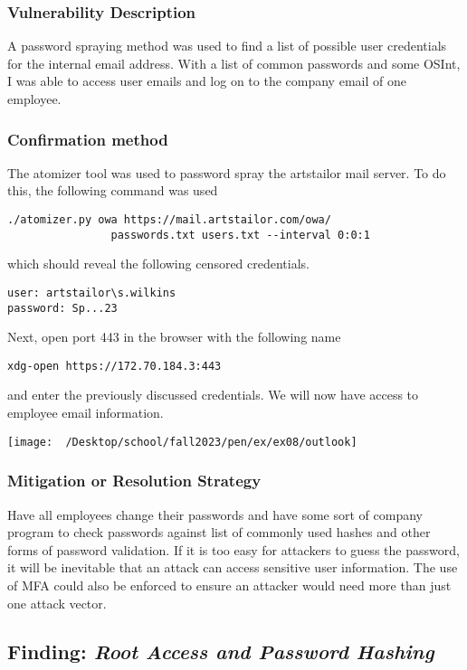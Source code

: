 \documentclass[notitlepage]{article}
\begin{document}
  	\subsubsection*{Vulnerability Description}
  		A password spraying method was used to find a list of possible user credentials for the internal email address. With a list of
        common passwords and some OSInt, I was able to access user emails and log on to the company email of one employee.

  	\subsubsection*{Confirmation method}
    The atomizer tool was used to password spray the artstailor mail server. To do this, the following
    command was used
\begin{verbatim}
./atomizer.py owa https://mail.artstailor.com/owa/ 
                passwords.txt users.txt --interval 0:0:1
\end{verbatim}
        which should reveal the following censored credentials.
\begin{verbatim}
user: artstailor\s.wilkins
password: Sp...23
\end{verbatim}
    Next, open port 443 in the browser with the following name
\begin{verbatim}
xdg-open https://172.70.184.3:443
\end{verbatim}
    and enter the previously discussed credentials. We will now have access to employee email information.
    
\texttt{[image: ~/Desktop/school/fall2023/pen/ex/ex08/outlook]}
				
    \subsubsection*{Mitigation or Resolution Strategy}
        Have all employees change their passwords and have some sort of company program to check passwords against list of commonly used hashes and other forms of password validation.
        If it is too easy for attackers to guess the password, it will be inevitable that an attack can access sensitive user information. The use of MFA could also be enforced
        to ensure an attacker would need more than just one attack vector.




  \subsection{Finding: \emph{Root Access and Password Hashing}}
\end{document}
